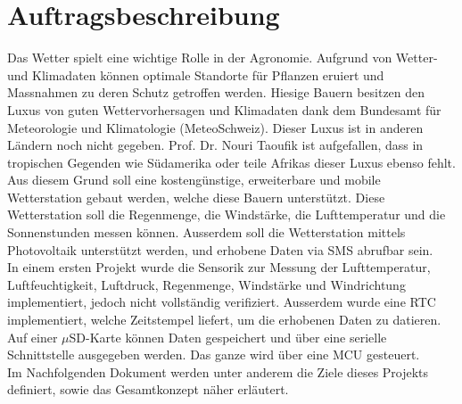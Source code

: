 \section*{Auftragsbeschreibung}
Das Wetter spielt eine wichtige Rolle in der Agronomie. Aufgrund von Wetter- und Klimadaten können optimale Standorte für Pflanzen eruiert und Massnahmen zu deren Schutz getroffen werden. Hiesige Bauern besitzen den Luxus von guten Wettervorhersagen und Klimadaten dank dem Bundesamt für Meteorologie und Klimatologie (MeteoSchweiz). Dieser Luxus ist in anderen Ländern noch nicht gegeben. Prof. Dr. Nouri Taoufik ist aufgefallen, dass in tropischen Gegenden wie Südamerika oder teile Afrikas dieser Luxus ebenso fehlt. \\[0.5cm]
Aus diesem Grund soll eine kostengünstige, erweiterbare und mobile Wetterstation gebaut werden, welche diese Bauern unterstützt. Diese Wetterstation soll die Regenmenge, die Windstärke, die Lufttemperatur und die Sonnenstunden messen können. Ausserdem soll die Wetterstation mittels Photovoltaik unterstützt werden, und erhobene Daten via SMS abrufbar sein. \\[0.5cm]
In einem ersten Projekt wurde die Sensorik zur Messung der Lufttemperatur, Luftfeuchtigkeit, Luftdruck, Regenmenge, Windstärke und Windrichtung implementiert, jedoch nicht vollständig verifiziert. Ausserdem wurde eine RTC implementiert, welche Zeitstempel liefert, um die erhobenen Daten zu datieren. Auf einer $\mu$SD-Karte können Daten gespeichert und über eine serielle Schnittstelle ausgegeben werden. Das ganze wird über eine MCU gesteuert. \\[0.5cm]
Im Nachfolgenden Dokument werden unter anderem die Ziele dieses Projekts definiert, sowie das Gesamtkonzept näher erläutert. 
